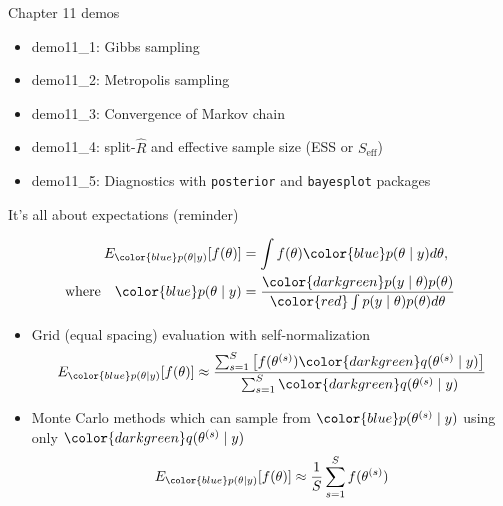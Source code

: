 \documentclass[finnish,english,t]{beamer}
\def\eff{\text{eff}}
\def\Seff{S_\eff}
\begin{document}
\begin{frame}{Chapter 11 demos}

  \begin{itemize}
\item demo11\_1: Gibbs sampling
\item demo11\_2: Metropolis sampling
\item demo11\_3: Convergence of Markov chain
\item demo11\_4: split-$\widehat{R}$ and effective sample size (ESS or $\Seff$)
\item demo11\_5: Diagnostics with \texttt{posterior} and \texttt{bayesplot} packages
\end{itemize}

\end{frame}

\begin{frame}{It's all about expectations (reminder)}

  \vspace{-1.5\baselineskip}
   \begin{align*}
     E_{\color{blue} p(\theta \mid y)}[f(\theta)] & = \int f(\theta) {\color{blue} p(\theta \mid y)} d\theta,\\
     \text{where} \quad
     {\color{blue} p(\theta \mid y)} & = \frac{\color{darkgreen}p(y \mid \theta)p(\theta)}{\color{red} \int p(y \mid \theta)p(\theta) d\theta}
   \end{align*}

 \begin{itemize}
   \vspace{-0.5\baselineskip}
    \item<4-> Grid (equal spacing) evaluation with self-normalization
      \begin{align*}
        E_{\color{blue} p(\theta \mid y)}[f(\theta)] \approx
        \frac{\sum_{s=1}^S \left[f(\theta^{(s)}){\color{darkgreen}q(\theta^{(s)} \mid y)}\right]}{\sum_{s=1}^S{\color{darkgreen}q(\theta^{(s)} \mid y)}}
      \end{align*}
    \item<5-> Monte Carlo methods which can sample from
      ${\color{blue}p(\theta^{(s)} \mid y)}$ using only
      ${\color{darkgreen}q(\theta^{(s)} \mid y)}$
         \vspace{-0.5\baselineskip}
      \begin{align*}
        E_{\color{blue} p(\theta \mid y)}[f(\theta)] \approx \frac{1}{S} \sum_{s=1}^S f(\theta^{(s)})
      \end{align*}
    \end{itemize}
   
\end{frame}
\end{document}
